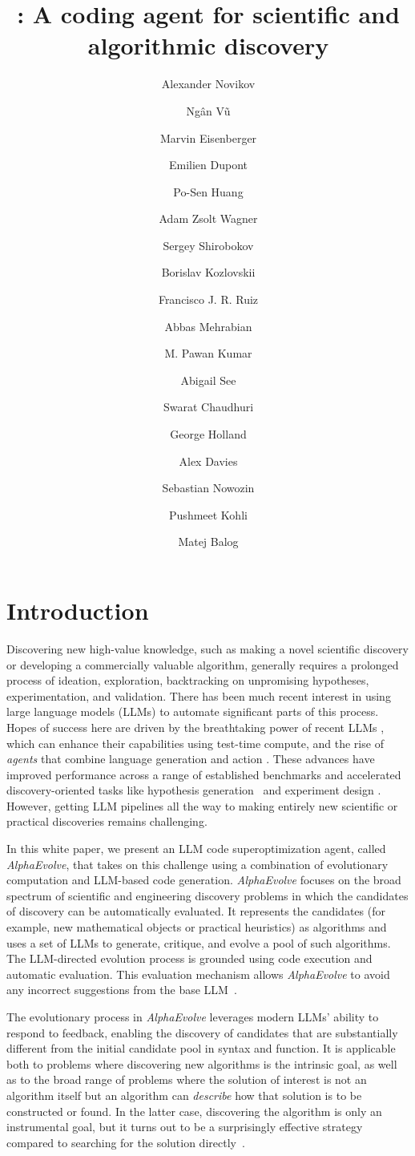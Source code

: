 \documentclass[logo,copyright,12pt]{googledeepmind}
\title{\method: A coding agent for scientific and algorithmic discovery}
\author[*]{Alexander Novikov}
\author[*]{Ngân Vũ}
\author[*]{Marvin Eisenberger}
\author[*]{Emilien Dupont}
\author[*]{Po-Sen Huang}
\author[*]{Adam Zsolt Wagner}
\author[*]{Sergey Shirobokov}
\author[*]{Borislav Kozlovskii}
\author[ \hspace{-0.2em}]{Francisco J. R. Ruiz}
\author[ \hspace{-0.2em}]{Abbas Mehrabian}
\author[ \hspace{-0.2em}]{M. Pawan Kumar}
\author[ \hspace{-0.2em}]{Abigail See}
\author[ \hspace{-0.2em}]{Swarat Chaudhuri}
\author[ \hspace{-0.2em}]{George Holland}
\author[ \hspace{-0.2em}]{Alex Davies}
\author[ \hspace{-0.2em}]{Sebastian Nowozin}
\author[ \hspace{-0.2em}]{Pushmeet Kohli}
\author[*]{Matej Balog}
\affil[ \hspace{-0.2em}]{Google DeepMind\footnote{See Acknowledgments and Author information section. $^*$Equal contributions.}}
\theoremstyle{definition}
\theoremstyle{remark}
\theoremstyle{plain}
\newcommand{\method}{\emph{AlphaEvolve}\xspace}
\begin{document}
\maketitle


\section{Introduction}

\label{sec:introduction}

Discovering new high-value knowledge, such as making a novel scientific discovery or developing a commercially valuable algorithm, generally requires a prolonged process of ideation, exploration, backtracking on unpromising hypotheses, experimentation, and validation. There has been much recent interest in using large language models (LLMs) to automate significant parts of this process.
Hopes of success here are driven by the breathtaking power of recent LLMs \cite{gemini25,o3}, which can enhance their capabilities using test-time compute, and the rise of \emph{agents} that combine language generation and action \cite{yao2023react,shinn2023reflexion}. These advances have improved performance across a range of established benchmarks and accelerated discovery-oriented tasks like hypothesis generation~\cite{gottweis2025towards} and experiment design \cite{huang2024crisprgpt,boiko2023autonomous}. However, getting LLM pipelines all the way to making entirely new scientific or practical discoveries remains challenging. 

In this white paper, we present an LLM code superoptimization agent, called \method, that takes on this challenge using a combination of evolutionary computation and LLM-based code generation. \method focuses on the broad spectrum of scientific and engineering discovery problems in which the candidates of discovery can be automatically evaluated. 
It represents the candidates (for example, new mathematical objects or practical heuristics) as algorithms and uses a set of LLMs to generate, critique, and evolve a pool of such algorithms. The LLM-directed evolution process is grounded using code execution and automatic evaluation. 
This evaluation mechanism allows \method to avoid any incorrect suggestions from the base LLM~\citep{huang2025survey}.

The evolutionary process in \method leverages modern LLMs' ability to respond to feedback, enabling the discovery of candidates that are substantially different from the initial candidate pool in syntax and function.
It is applicable both to problems where discovering new algorithms is the intrinsic goal, as well as to the broad range of problems where the solution of interest is not an algorithm itself but an algorithm can \emph{describe} how that solution is to be constructed or found.
In the latter case, discovering the algorithm is only an instrumental goal, but it turns out to be a surprisingly effective strategy compared to searching for the solution directly~\cite{paredes2023mathematical}.
\end{document}
